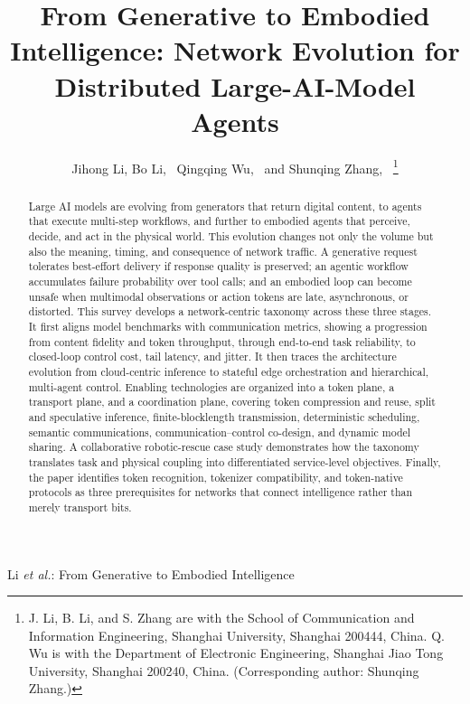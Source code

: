 \documentclass[letterpaper,journal]{IEEEtran}
\begin{document}
\title{From Generative to Embodied Intelligence: Network Evolution for Distributed Large-AI-Model Agents}

\author{Jihong Li, Bo Li,~
Qingqing Wu,~
and Shunqing Zhang,~%
\thanks{J. Li, B. Li, and S. Zhang are with the School of Communication and
Information Engineering, Shanghai University, Shanghai 200444, China.
Q. Wu is with the Department of Electronic Engineering, Shanghai Jiao Tong
University, Shanghai 200240, China. (Corresponding author: Shunqing Zhang.)}}

%
{Li \MakeLowercase{\textit{et al.}}: From Generative to Embodied Intelligence}

\maketitle

\begin{abstract}
Large AI models are evolving from generators that return digital content, to
agents that execute multi-step workflows, and further to embodied agents that
perceive, decide, and act in the physical world. This evolution changes not
only the volume but also the meaning, timing, and consequence of network
traffic. A generative request tolerates best-effort delivery if response
quality is preserved; an agentic workflow accumulates failure probability over
tool calls; and an embodied loop can become unsafe when multimodal observations
or action tokens are late, asynchronous, or distorted. This survey develops a
network-centric taxonomy across these three stages. It first aligns model
benchmarks with communication metrics, showing a progression from content
fidelity and token throughput, through end-to-end task reliability, to
closed-loop control cost, tail latency, and jitter. It then traces the
architecture evolution from cloud-centric inference to stateful edge
orchestration and hierarchical, multi-agent control. Enabling technologies are
organized into a token plane, a transport plane, and a coordination plane,
covering token compression and reuse, split and speculative inference,
finite-blocklength transmission, deterministic scheduling, semantic
communications, communication--control co-design, and dynamic model sharing.
A collaborative robotic-rescue case study demonstrates how the taxonomy
translates task and physical coupling into differentiated service-level
objectives. Finally, the paper identifies token recognition, tokenizer
compatibility, and token-native protocols as three prerequisites for networks
that connect intelligence rather than merely transport bits.
\end{abstract}
\end{document}
